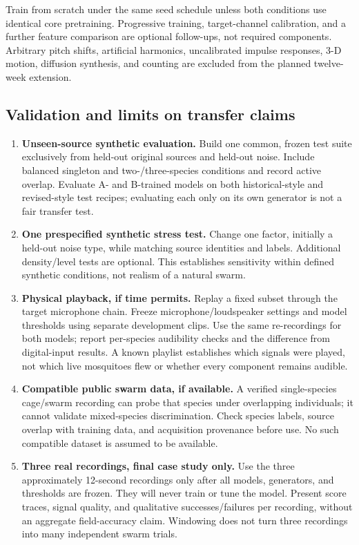 \documentclass[a4paper,11pt]{article}
\begin{document}
Train from scratch under the same seed schedule unless both conditions use identical core pretraining. Progressive training, target-channel calibration, and a further feature comparison are optional follow-ups, not required components. Arbitrary pitch shifts, artificial harmonics, uncalibrated impulse responses, 3-D motion, diffusion synthesis, and counting are excluded from the planned twelve-week extension.

\subsection{Validation and limits on transfer claims}
\begin{enumerate}
\item \textbf{Unseen-source synthetic evaluation.} Build one common, frozen test suite exclusively from held-out original sources and held-out noise. Include balanced singleton and two-/three-species conditions and record active overlap. Evaluate A- and B-trained models on both historical-style and revised-style test recipes; evaluating each only on its own generator is not a fair transfer test.
\item \textbf{One prespecified synthetic stress test.} Change one factor, initially a held-out noise type, while matching source identities and labels. Additional density/level tests are optional. This establishes sensitivity within defined synthetic conditions, not realism of a natural swarm.
\item \textbf{Physical playback, if time permits.} Replay a fixed subset through the target microphone chain. Freeze microphone/loudspeaker settings and model thresholds using separate development clips. Use the same re-recordings for both models; report per-species audibility checks and the difference from digital-input results. A known playlist establishes which signals were played, not which live mosquitoes flew or whether every component remains audible.
\item \textbf{Compatible public swarm data, if available.} A verified single-species cage/swarm recording can probe that species under overlapping individuals; it cannot validate mixed-species discrimination. Check species labels, source overlap with training data, and acquisition provenance before use. No such compatible dataset is assumed to be available.
\item \textbf{Three real recordings, final case study only.} Use the three approximately 12-second recordings only after all models, generators, and thresholds are frozen. They will never train or tune the model. Present score traces, signal quality, and qualitative successes/failures per recording, without an aggregate field-accuracy claim. Windowing does not turn three recordings into many independent swarm trials.
\end{enumerate}
\end{document}
